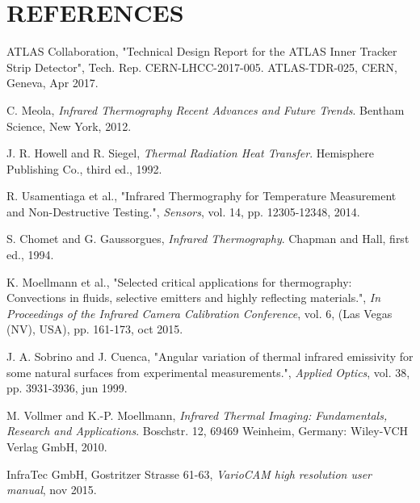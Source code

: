 \pagestyle{references}

\section*{\uppercase{References}}\label{referen}
	\bigskip
	\bigskip
	\begin{enumerate}[label={[\arabic*]}]
	
		\item ATLAS Collaboration, "Technical Design Report for the ATLAS Inner Tracker Strip Detector", Tech. Rep. CERN-LHCC-2017-005. ATLAS-TDR-025, CERN, Geneva, Apr 2017.\label{ref1}
		
		\item C. Meola,	\textit{Infrared Thermography Recent Advances and Future Trends}. Bentham Science, New York, 2012.\label{ref2}
		
		\item J. R. Howell and R. Siegel, \textit{Thermal Radiation Heat Transfer}. Hemisphere Publishing Co., third ed., 1992.\label{ref3}
		
		\item R. Usamentiaga et al., "Infrared Thermography for Temperature Measurement and Non-Destructive Testing.", \textit{Sensors}, vol. 14, pp. 12305-12348, 2014.\label{ref4}
		 
		\item S. Chomet and G. Gaussorgues, \textit{Infrared Thermography}. Chapman and Hall, first ed., 1994.\label{ref5}
		
		\item K. Moellmann et al., "Selected critical applications for thermography: Convections in fluids, selective emitters and highly reflecting materials.", \textit{In Proceedings of the Infrared Camera Calibration Conference}, vol. 6, (Las Vegas (NV), USA), pp. 161-173, oct 2015.\label{ref6}
		
		\item J. A. Sobrino and J. Cuenca, "Angular variation of thermal infrared emissivity for some natural surfaces from experimental measurements.", \textit{Applied Optics}, vol. 38, pp. 3931-3936, jun 1999.\label{ref7}
		
		\item M. Vollmer and K.-P. Moellmann,	\textit{Infrared Thermal Imaging: Fundamentals, Research and Applications}. Boschstr. 12, 69469 Weinheim, Germany: Wiley-VCH Verlag GmbH, 2010.\label{ref8}
		
		\item InfraTec GmbH, Gostritzer Strasse 61-63, \textit{VarioCAM \textregistered\space high resolution user manual}, nov 2015.\label{ref9}
		

\end{enumerate}
